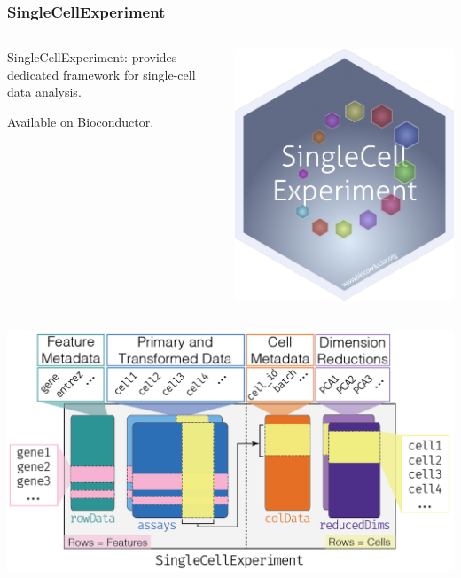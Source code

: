\documentclass{beamer}
\newcommand{\frametitlesection}[1]{\frametitle{\centering #1 \footnotesize \hspace{0pt plus 1 filll} \insertsection}}
\begin{document}
\begin{frame}
    \frametitlesection{SingleCellExperiment}
    
    
    \begin{columns}
        \begin{column}{0.8\textwidth}
            SingleCellExperiment: provides dedicated framework for single-cell 
            data analysis. 
            
            Available on Bioconductor.
        \end{column}
        \begin{column}{0.2\textwidth}
            \includegraphics[width=\linewidth]{figs/sticker_SingleCellExperiment.png}
        \end{column}
    \end{columns}
    
    \includegraphics[width=0.9\linewidth]{figs/SingleCellExperiment.png}
    
\end{frame}
\end{document}
